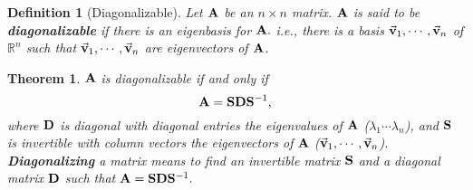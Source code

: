 \documentclass[12pt, a4paper]{article}
\newtheorem{thm}{Theorem}[subsection]
\newtheorem{df}{Definition}[subsection]
\def\R{{\mathbb{R}}}
\def\vecv{\va{v}}
\def\matrixA{\vb{A}}
\def\matrixD{\vb{D}}
\def\matrixS{\vb{S}}
\begin{document}
\begin{df}[Diagonalizable]
	Let $\matrixA$ be an $n\times n$ matrix. $\matrixA$ is said to be \textbf{diagonalizable} if there is an eigenbasis for $\matrixA.$ i.e., there is a basis $\vecv_1,\cdots,\vecv_n$ of $\R^n$ such that $\vecv_1,\cdots,\vecv_n$ are eigenvectors of $\matrixA$.	
\end{df}
\begin{thm}
	$\matrixA$ is diagonalizable if and only if \[\matrixA=\matrixS\matrixD\matrixS^{-1},\] where $\matrixD$ is diagonal with diagonal entries the eigenvalues of $\matrixA$ ($\lambda_1\cdots\lambda_n$), and $\matrixS$ is invertible with column vectors the eigenvectors of $\matrixA$ ($\vecv_1,\cdots,\vecv_n$). \textbf{Diagonalizing} a matrix means to find an invertible matrix $\matrixS$ and a diagonal matrix $\matrixD$ such that $\matrixA=\matrixS\matrixD\matrixS^{-1}.$
\end{thm}
\end{document}
